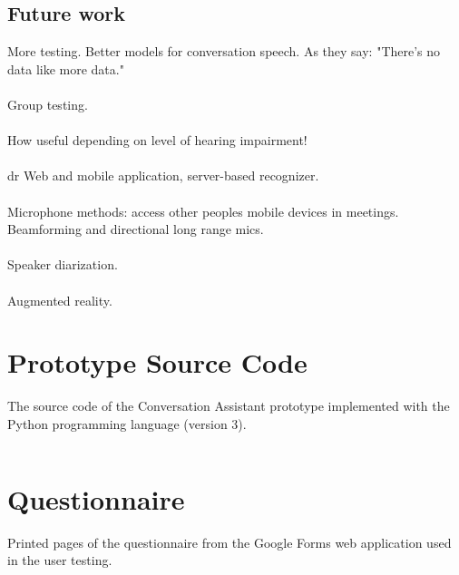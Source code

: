 \documentclass[english, 12pt, a4paper, pdftex, elec, utf8]{aaltothesis}
\begin{document}
\subsection{Future work}

More testing. Better models for conversation speech. As they say: "There's no data like more data." \\\\
Group testing. \\\\
How useful depending on level of hearing impairment! \\\\dr
Web and mobile application, server-based recognizer. \\\\
Microphone methods: access other peoples mobile devices in meetings. Beamforming and directional long range mics. \\\\
Speaker diarization. \\\\
Augmented reality.

\clearpage




\clearpage

\appendix

\section{Prototype Source Code} \label{sec:proto}

The source code of the Conversation Assistant prototype implemented with the Python programming language (version 3).

\inputminted[fontsize=\scriptsize]{python}{keskusteluavustin.py} %

\clearpage

\section{Questionnaire} \label{sec:kysely}

Printed pages of the questionnaire from the Google Forms web application used in the user testing.
\end{document}
